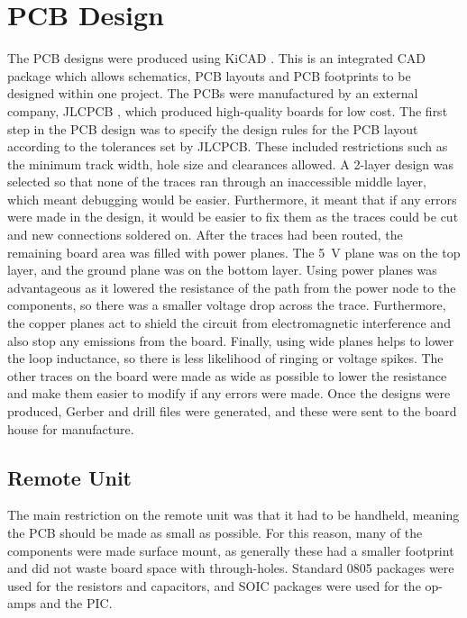 \section{PCB Design}
The PCB designs were produced using KiCAD \cite{kicad}. This is an integrated CAD package which allows schematics, PCB layouts and PCB footprints to be designed within one project. The PCBs were manufactured by an external company, JLCPCB \cite{pcb_house}, which produced high-quality boards for low cost. The first step in the PCB design was to specify the design rules for the PCB layout according to the tolerances set by JLCPCB. These included restrictions such as the minimum track width, hole size and clearances allowed. A 2-layer design was selected so that none of the traces ran through an inaccessible middle layer, which meant debugging would be easier. Furthermore, it meant that if any errors were made in the design, it would be easier to fix them as the traces could be cut and new connections soldered on. After the traces had been routed, the remaining board area was filled with power planes. The \SI{+5}{\volt} plane was on the top layer, and the ground plane was on the bottom layer. Using power planes was advantageous as it lowered the resistance of the path from the power node to the components, so there was a smaller voltage drop across the trace. Furthermore, the copper planes act to shield the circuit from electromagnetic interference and also stop any emissions from the board. Finally, using wide planes helps to lower the loop inductance, so there is less likelihood of ringing or voltage spikes. The other traces on the board were made as wide as possible to lower the resistance and make them easier to modify if any errors were made. Once the designs were produced, Gerber and drill files were generated, and these were sent to the board house for manufacture.\\


\subsection{Remote Unit}
The main restriction on the remote unit was that it had to be handheld, meaning the PCB should be made as small as possible. For this reason, many of the components were made surface mount, as generally these had a smaller footprint and did not waste board space with through-holes. Standard 0805 packages were used for the resistors and capacitors, and SOIC packages were used for the op-amps and the PIC.\\

